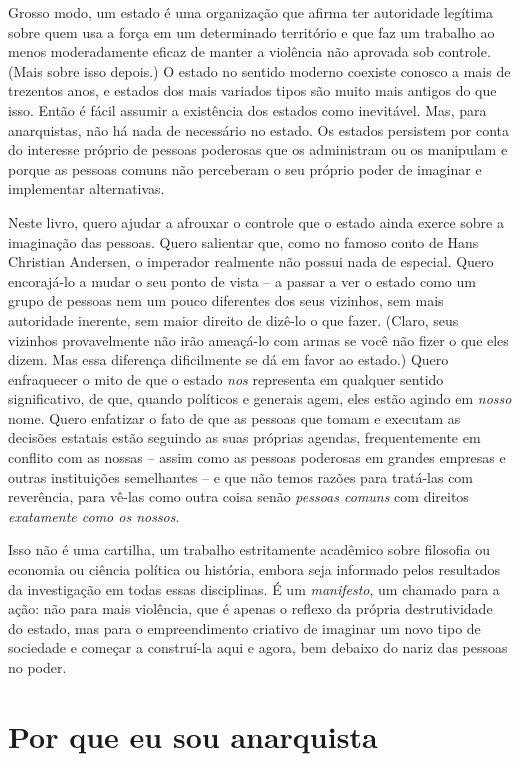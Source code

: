 Grosso modo, um estado é uma organização que afirma ter autoridade legítima sobre quem usa a força em um determinado território e que faz um trabalho ao menos moderadamente eficaz de manter a violência não aprovada sob controle. (Mais sobre isso depois.) O estado no sentido moderno coexiste conosco a mais de trezentos anos, e estados dos mais variados tipos são muito mais antigos do que isso. Então é fácil assumir a existência dos estados como inevitável. Mas, para anarquistas, não há nada de necessário no estado. Os estados persistem por conta do interesse próprio de pessoas poderosas que os administram ou os manipulam e porque as pessoas comuns não perceberam o seu próprio poder de imaginar e implementar alternativas.

Neste livro, quero ajudar a afrouxar o controle que o estado ainda exerce sobre a imaginação das pessoas. Quero salientar que, como no famoso conto de Hans Christian Andersen, o imperador realmente não possui nada de especial. Quero encorajá-lo a mudar o seu ponto de vista -- a passar a ver o estado como um grupo de pessoas nem um pouco diferentes dos seus vizinhos, sem mais autoridade inerente, sem maior direito de dizê-lo o que fazer. (Claro, seus vizinhos provavelmente não irão ameaçá-lo com armas se você não fizer o que eles dizem. Mas essa diferença dificilmente se dá em favor ao estado.) Quero enfraquecer o mito de que o estado \emph{nos} representa em qualquer sentido significativo, de que, quando políticos e generais agem, eles estão agindo em \emph{nosso} nome. Quero enfatizar o fato de que as pessoas que tomam e executam as decisões estatais estão seguindo as suas próprias agendas, frequentemente em conflito com as nossas -- assim como as pessoas poderosas em grandes empresas e outras instituições semelhantes -- e que não temos razões para tratá-las com reverência, para vê-las como outra coisa senão \emph{pessoas comuns} com direitos \emph{exatamente como os nossos}.

Isso não é uma cartilha, um trabalho estritamente acadêmico sobre filosofia ou economia ou ciência política ou história, embora seja informado pelos resultados da investigação em todas essas disciplinas. É um \emph{manifesto}, um chamado para a ação: não para mais violência, que é apenas o reflexo da própria destrutividade do estado, mas para o empreendimento criativo de imaginar um novo tipo de sociedade e começar a construí-la aqui e agora, bem debaixo do nariz das pessoas no poder.

\section{Por que eu sou anarquista}

